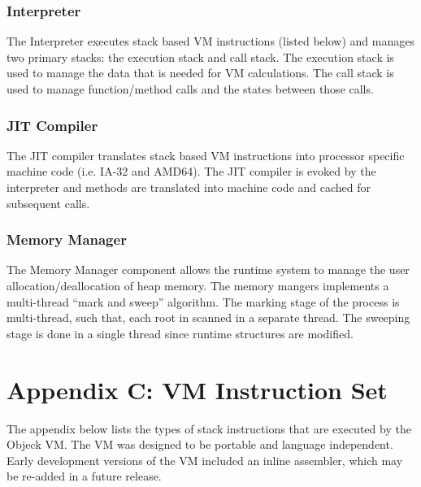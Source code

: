 \documentclass[11pt]{article}
\begin{document}
\subsubsection{Interpreter}
The Interpreter executes stack based VM instructions (listed below)
and manages two primary stacks: the execution stack and call stack.
The execution stack is used to manage the data that is needed for VM
calculations.  The call stack is used to manage function/method calls
and the states between those calls.

\subsubsection{JIT Compiler}
The JIT compiler translates stack based VM instructions into processor
specific machine code (i.e. IA-32 and AMD64).  The JIT compiler is
evoked by the interpreter and methods are translated into machine code
and cached for subsequent calls.

\subsubsection{Memory Manager}
The Memory Manager component allows the runtime system to manage the
user allocation/deallocation of heap memory.  The memory mangers
implements a multi-thread ``mark and sweep'' algorithm.  The marking
stage of the process is multi-thread, such that, each root in scanned
in a separate thread.  The sweeping stage is done in a single thread
since runtime structures are modified.

\section{Appendix C: VM Instruction Set}
The appendix below lists the types of stack instructions that are
executed by the Objeck VM.  The VM was designed to be portable and
language independent.  Early development versions of the VM included
an inline assembler, which may be re-added in a future release.
\end{document}
